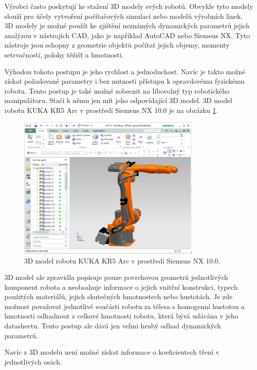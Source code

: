 Výrobci často poskytují ke stažení 3D modely svých robotů. Obvykle tyto modely slouží pro účely vytvoření počítačových simulací nebo modelů výrobních linek. 
3D modely je možné použít ke zjištění neznámých dynamických parametrů jejich analýzou v nástrojích CAD, jako je například AutoCAD nebo Siemens NX. Tyto nástroje jsou schopny z geometrie objektů počítat jejich objemy, momenty setrvačnosti, polohy těžišť a hmotnosti.

Výhodou tohoto postupu je jeho rychlost a jednoduchost. Navíc je takto možné získat požadované parametry i bez nutnosti přístupu k opravdovému fyzickému robotu. Tento postup je také možné zobecnit na libovolný typ robotického manipulátoru. Stačí k němu jen mít jeho odpovídající 3D model. 3D model robotu KUKA KR5 Arc v prostředí Siemens NX 10.0 je na obrázku \ref{kuka_3d_pic}.

\begin{figure}[ht]
    \includegraphics[width=0.8\textwidth]{kuka_3d}
    \caption{3D model robotu KUKA KR5 Arc v prostředí Siemens NX 10.0.}
    \label{kuka_3d_pic}
\end{figure}

3D model ale zpravidla popisuje pouze povrchovou geometrii jednotlivých komponent robota a neobsahuje informace o jejich vnitřní konstrukci, typech použitých materiálů, jejich skutečných hmotnostech nebo hustotách. Je zde možnost považovat jednotlivé součásti robotu za tělesa s homogenní hustotou a hmotnosti odhadnout z celkové hmotnosti robotu, která bývá udávána v jeho datasheetu. Tento postup ale dává jen velmi hrubý odhad dynamických parametrů. 

Navíc z 3D modelu není možné získat informace o koeficientech tření v jednotlivých osách. 

